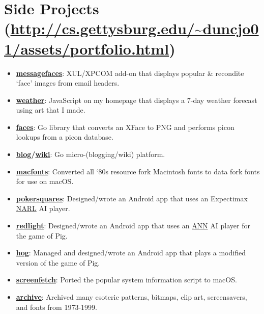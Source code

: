\documentclass[11pt]{article}
\begin{document}
\section*{Side Projects (\url{http://cs.gettysburg.edu/~duncjo01/assets/portfolio.html})}
\begin{itemize}[noitemsep]
	\item \href{https://github.com/JohnDDuncanIII/MessageFaces}{\textbf{messagefaces}}: XUL/XPCOM add-on that displays popular \& recondite `face' images from email headers.
	\item \href{https://dataswamp.org/~john/assets/scripts/weather.js}{\textbf{weather}}: JavaScript on my homepage that displays a 7-day weather forecast using art that I made.
	\item \href{https://github.com/JohnDDuncanIII/faces}{\textbf{faces}}: Go library that converts an XFace to PNG and performs picon lookups from a picon database.
	\item \textbf{\href{https://github.com/JohnDDuncanIII/blog}{blog}/\href{https://github.com/JohnDDuncanIII/wiki}{wiki}}: Go micro-(blogging/wiki) platform.
	\item \textbf{\href{https://github.com/JohnDDuncanIII/macfonts}{macfonts}}: Converted all `80s resource fork Macintosh fonts to data fork fonts for use on macOS. 
	\item \href{https://github.com/JohnDDuncanIII/PokerSquares}{\textbf{pokersquares}}: Designed/wrote an Android app that uses an Expectimax \href{https://www.aaai.org/ocs/index.php/AAAI/AAAI16/paper/view/12537/12191}{NARL} AI player. 
	\item \href{https://github.com/JohnDDuncanIII/redlight}{\textbf{redlight}}: Designed/wrote an Android app that uses an \href{http://cs.gettysburg.edu/~tneller/papers/fowlplay.pdf}{ANN} AI player for the game of Pig.
	\item \href{https://github.com/JohnDDuncanIII/hog}{\textbf{hog}}: Managed and designed/wrote an Android app that plays a modified version of the game of Pig. 
	\item \href{https://github.com/KittyKatt/screenFetch/blob/master/screenfetch.1\#L126}{\textbf{screenfetch}}: Ported the popular system information script to macOS.
	\item \href{http://cs.gettysburg.edu/~duncjo01/archive/}{\textbf{archive}}: Archived many esoteric patterns, bitmaps, clip art, screensavers, and fonts from 1973-1999.
\end{itemize}
\end{document}
